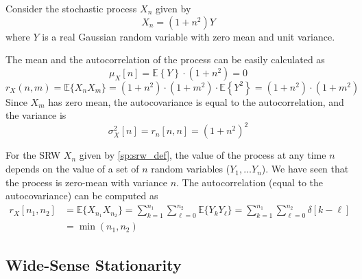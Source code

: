\begin{example}
\label{Ex:SimpleProc}
Consider the stochastic process $X_n$ given by
\begin{equation}
X_n = (1 + n^2) Y 
\end{equation}
where $Y$ is a real Gaussian random variable with zero mean and unit variance. 

The mean and the autocorrelation of the process can be easily calculated as
\begin{equation}
\mu_X[n] = \mathbb{E}\left\{Y\right\} \cdot (1 + n^2) = 0
\end{equation}
\begin{equation}
r_X(n,m) = \mathbb{E}\{X_n X_m\}
         = (1 + n^2) \cdot (1 + m^2) \cdot \mathbb{E}\left\{Y^2\right\} 
         =  (1 + n^2) \cdot (1 + m^2) 
\label{ec:autocorr2}
\end{equation}
Since $X_m$ has zero mean, the autocovariance is equal to the autocorrelation, and the variance is
\begin{equation}
\sigma_X^2[n] = r_n[n, n] = \left(1 + n^2\right)^2
\end{equation}

\end{example}

\begin{example}
\label{Ex:RandomWalk}

For the SRW $X_n$ given by \eqref{sp:srw_def}, the value of the process at any time $n$ depends on the value of a set of $n$ random variables ($Y_1,\ldots Y_n$). We have seen that the process is zero-mean with variance $n$. The autocorrelation (equal to the autocovariance) can be computed as
\begin{align}
r_X[n_1, n_2] 
	&= \mathbb{E}\{X_{n_1}X_{n_2}\}  
	 = \sum_{k=1}^{n_1} \sum_{\ell=0}^{n_2} \mathbb{E}\{Y_k Y_\ell\}  
	 = \sum_{k=1}^{n_1} \sum_{\ell=0}^{n_2} \delta[k - \ell]   \nonumber\\
	&= \min(n_1, n_2)
\label{eq:rx_srw}
\end{align}

\end{example}


\subsection{Wide-Sense Stationarity}
\label{sec:CaracterizProcStoc}

